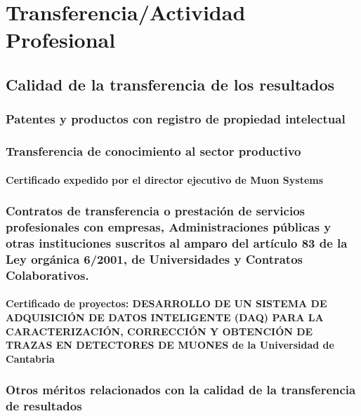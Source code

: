 \documentclass[a4paper, 11pt, twoside, openright]{report}
\begin{document}
\chapter{Transferencia/Actividad Profesional}

\section{Calidad de la transferencia de los resultados}

\subsection{Patentes y productos con registro de propiedad intelectual}

\subsection{Transferencia de conocimiento al sector productivo}

\subsubsection{Certificado expedido por el director ejecutivo de Muon Systems}


\subsection{Contratos de transferencia o prestación de servicios profesionales con empresas, Administraciones públicas y otras 	instituciones suscritos al amparo del artículo 83 de la Ley orgánica 6/2001, de Universidades y Contratos Colaborativos.}

\subsubsection{Certificado de proyectos: DESARROLLO DE UN SISTEMA DE ADQUISICIÓN DE DATOS INTELIGENTE (DAQ) PARA LA CARACTERIZACIÓN, CORRECCIÓN Y OBTENCIÓN DE TRAZAS EN 	DETECTORES DE MUONES de la Universidad de Cantabria}


\subsection{Otros méritos relacionados con la calidad de la transferencia de resultados}
\end{document}

